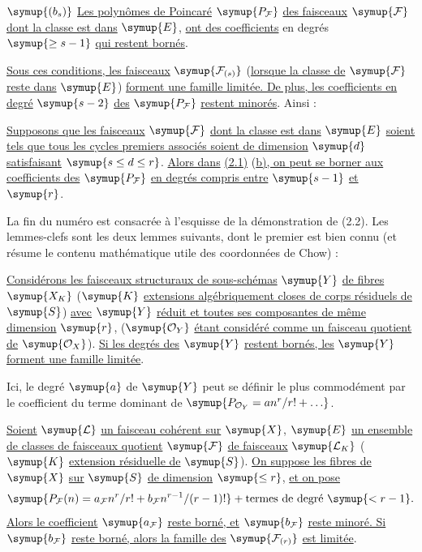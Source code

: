\medskip
\noindent $\symup{(b_s)}$ \uline{Les polynômes de Poincaré} $\symup{P_{\mathcal F}}$ \uline{des faisceaux}
$\symup{\mathcal F}$ \uline{dont la classe est dans} $\symup{E}$, \uline{ont des coefficients} en degrés
$\symup{\geq s-1}$ \uline{qui restent bornés}.

\uline{Sous ces conditions, les faisceaux} $\symup{\mathcal F_{(s)}}$ (\uline{lorsque la classe de}
$\symup{\mathcal F}$ \uline{reste dans} $\symup{E}$) \uline{forment une famille limitée. De plus, les
coefficients en degré} $\symup{s-2}$ \uline{des} $\symup{P_{\mathcal F}}$ \uline{restent minorés}.
Ainsi :

 \uline{Supposons que les faisceaux} $\symup{\mathcal F}$ \uline{dont la classe
est dans} $\symup{E}$ \uline{soient tels que tous les cycles premiers associés soient de
dimension} $\symup{d}$ \uline{satisfaisant} $\symup{s\leq d\leq r}$. \uline{Alors dans} \uline{(2.1)} (\uline{b), on peut se
borner aux coefficients des} $\symup{P_{\mathcal F}}$ \uline{en degrés compris entre} $\symup{s-1}$ \uline{et}
$\symup{r}$.

La fin du numéro est consacrée à l'esquisse de la démonstration de (2.2). Les
lemmes-clefs sont les deux lemmes suivants, dont le premier est bien connu (et
résume le contenu mathématique utile des coordonnées de Chow) :

 \uline{Considérons les faisceaux structuraux de
sous-schémas} $\symup{Y}$ \uline{de fibres} $\symup{X_K}$ ($\symup{K}$ \uline{extensions algébriquement closes de corps
résiduels de} $\symup{S}$) \uline{avec} $\symup{Y}$ \uline{réduit et toutes ses composantes de même dimension}
$\symup{r}$, ($\symup{\mathcal O_Y}$ \uline{étant considéré comme un faisceau quotient de}
$\symup{\mathcal O_X}$). \uline{Si les degrés des} $\symup{Y}$ \uline{restent bornés, les} $\symup{Y}$ \uline{forment une
famille limitée}.

Ici, le degré $\symup{a}$ de $\symup{Y}$ peut se définir le plus commodément par le coefficient
du terme dominant de $\symup{P_{\mathcal O_Y}=an^r/r!+\ldots}$.

 \uline{Soient} $\symup{\mathcal L}$ \uline{un faisceau cohérent sur} $\symup{X}$, $\symup{E}$ \uline{un
ensemble de classes de faisceaux quotient} $\symup{\mathcal F}$ \uline{de faisceaux}
$\symup{\mathcal L_K}$ ($\symup{K}$ \uline{extension résiduelle de} $\symup{S}$). \uline{On suppose les fibres de} $\symup{X}$
\uline{sur} $\symup{S}$ \uline{de dimension} $\symup{\leq r}$, \uline{et on pose}
\[
\symup{P_{\mathcal F}(n)=a_{\mathcal F}n^r/r!+b_{\mathcal F}n^{r-1}/(r-1)!}+\text{termes de degré $\symup{<r-1}$}.
\]
\uline{Alors le coefficient} $\symup{a_{\mathcal F}}$ \uline{reste borné, et} $\symup{b_{\mathcal F}}$ \uline{reste
minoré. Si} $\symup{b_{\mathcal F}}$ \uline{reste borné, alors la famille des}
$\symup{\mathcal F_{(r)}}$ \uline{est limitée}.

